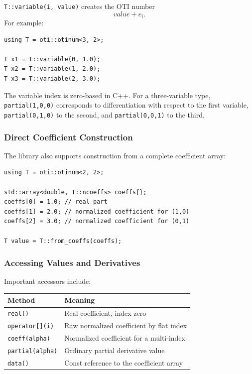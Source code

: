 \documentclass[11pt]{article}
\begin{document}
\texttt{T::variable(i, value)} creates the OTI number
\[
    value + e_i.
\]
For example:

\begin{lstlisting}[style=cppstyle]
using T = oti::otinum<3, 2>;

T x1 = T::variable(0, 1.0);
T x2 = T::variable(1, 2.0);
T x3 = T::variable(2, 3.0);
\end{lstlisting}

The variable index is zero-based in C++. For a three-variable type,
\texttt{partial({1,0,0})} corresponds to differentiation with respect to the
first variable, \texttt{partial({0,1,0})} to the second, and
\texttt{partial({0,0,1})} to the third.

\subsubsection{Direct Coefficient Construction}

The library also supports construction from a complete coefficient array:

\begin{lstlisting}[style=cppstyle]
using T = oti::otinum<2, 2>;

std::array<double, T::ncoeffs> coeffs{};
coeffs[0] = 1.0; // real part
coeffs[1] = 2.0; // normalized coefficient for (1,0)
coeffs[2] = 3.0; // normalized coefficient for (0,1)

T value = T::from_coeffs(coeffs);
\end{lstlisting}

\subsubsection{Accessing Values and Derivatives}

Important accessors include:

\begin{center}
\begin{tabular}{ll}
\toprule
Method & Meaning \\
\midrule
\texttt{real()} & Real coefficient, index zero \\
\texttt{operator[](i)} & Raw normalized coefficient by flat index \\
\texttt{coeff(alpha)} & Normalized coefficient for a multi-index \\
\texttt{partial(alpha)} & Ordinary partial derivative value \\
\texttt{data()} & Const reference to the coefficient array \\
\bottomrule
\end{tabular}
\end{center}
\end{document}
